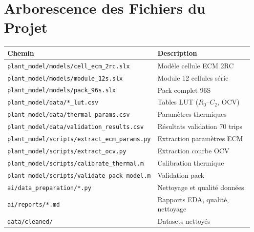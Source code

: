 \documentclass[a4paper,11pt]{article}
\begin{document}
\section{Arborescence des Fichiers du Projet}

\begin{center}
\small
\renewcommand{\arraystretch}{1.2}
\begin{tabular}{p{6.5cm} p{6cm}}
\toprule
\textbf{Chemin} & \textbf{Description} \\
\midrule
\texttt{plant\_model/models/cell\_ecm\_2rc.slx} & Modèle cellule ECM 2RC \\
\texttt{plant\_model/models/module\_12s.slx} & Module 12 cellules série \\
\texttt{plant\_model/models/pack\_96s.slx} & Pack complet 96S \\
\texttt{plant\_model/data/*\_lut.csv} & Tables LUT ($R_0$--$C_2$, OCV) \\
\texttt{plant\_model/data/thermal\_params.csv} & Paramètres thermiques \\
\texttt{plant\_model/data/validation\_results.csv} & Résultats validation 70 trips \\
\texttt{plant\_model/scripts/extract\_ecm\_params.py} & Extraction paramètres ECM \\
\texttt{plant\_model/scripts/extract\_ocv.py} & Extraction courbe OCV \\
\texttt{plant\_model/scripts/calibrate\_thermal.m} & Calibration thermique \\
\texttt{plant\_model/scripts/validate\_pack\_model.m} & Validation pack \\
\texttt{ai/data\_preparation/*.py} & Nettoyage et qualité données \\
\texttt{ai/reports/*.md} & Rapports EDA, qualité, nettoyage \\
\texttt{data/cleaned/} & Datasets nettoyés \\
\bottomrule
\end{tabular}
\end{center}
\end{document}
